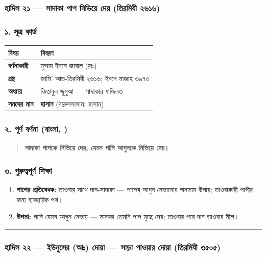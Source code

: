 \subsubsection*{হাদিস ২১ — সাদাকা পাপ নিভিয়ে দেয় (তিরমিযী ২৬১৬)}

\subsubsection*{১. সূত্র কার্ড}

\begin{table}[h]\centering\small
\begin{tabular}{ll}
বিষয় & বিবরণ \\
\hline
\textbf{বর্ণনাকারী} & মুআয ইবনে জাবাল (রাঃ) \\
\textbf{গ্রন্থ} & জামি' আত-তিরমিযী ২৬১৬; ইবনে মাজাহ ৩৯৭৩ \\
\textbf{অধ্যায়} & কিতাবুল জুমুআ — সাদাকার ফজিলত \\
\textbf{সনদের মান} & \textbf{হাসান} (দারুসসালাম: হাসান) \\
\hline
\end{tabular}
\end{table}

\subsubsection*{২. পূর্ণ বর্ণনা (বাংলা, )}

\begin{quote}
\textbf{সাদাকা পাপকে নিভিয়ে দেয়, যেমন পানি আগুনকে নিভিয়ে দেয়।}
\end{quote}

\subsubsection*{৩. গুরুত্বপূর্ণ শিক্ষা}

\begin{enumerate}
\item \textbf{পাপের প্রতিষেধক:} তাওবার সাথে দান-সাদাকা — পাপের আগুন নেভানোর অন্যতম উপায়; তাওবাকারী পাপীর জন্য ব্যবহারিক পথ।
\item \textbf{উপমা:} পানি যেমন আগুন নেভায় — সাদাকা তেমনি পাপ মুছে দেয়; তাওবার পরে দান তাওবার সীল।
\end{enumerate}
\medskip\hrule\medskip

\subsubsection*{হাদিস ২২ — ইউনুসের (আঃ) দোয়া — সাড়া পাওয়ার দোয়া (তিরমিযী ৩৫০৫)}

